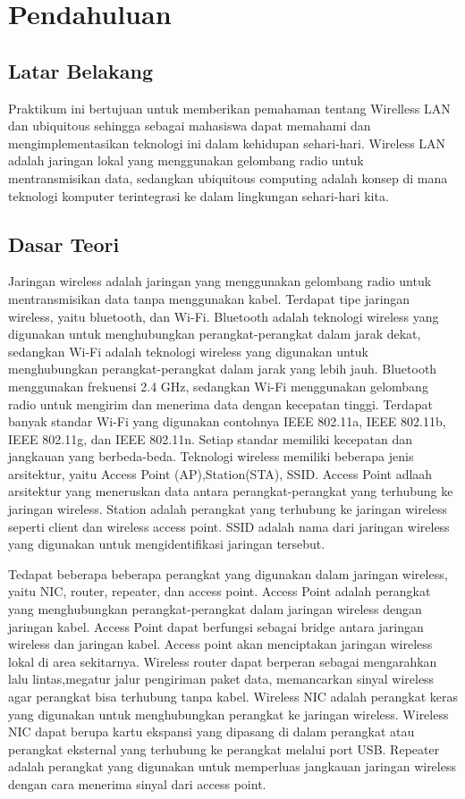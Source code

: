 \section{Pendahuluan}
\subsection{Latar Belakang}
Praktikum ini bertujuan untuk memberikan pemahaman tentang Wirelless LAN dan ubiquitous sehingga sebagai
mahasiswa dapat memahami dan mengimplementasikan teknologi ini dalam kehidupan sehari-hari. Wireless LAN adalah jaringan lokal yang menggunakan gelombang radio untuk mentransmisikan data,
sedangkan ubiquitous computing adalah konsep di mana teknologi komputer terintegrasi ke dalam lingkungan sehari-hari kita.

\subsection{Dasar Teori}
Jaringan wireless adalah jaringan yang menggunakan gelombang radio untuk mentransmisikan data tanpa menggunakan kabel.
Terdapat tipe jaringan wireless, yaitu bluetooth, dan Wi-Fi. Bluetooth adalah teknologi wireless yang digunakan untuk 
menghubungkan perangkat-perangkat dalam jarak dekat, sedangkan Wi-Fi adalah teknologi wireless yang digunakan untuk 
menghubungkan perangkat-perangkat dalam jarak yang lebih jauh. Bluetooth menggunakan frekuensi 2.4 GHz, sedangkan Wi-Fi
menggunakan gelombang radio untuk mengirim dan menerima data dengan kecepatan tinggi. Terdapat banyak standar Wi-Fi yang digunakan
contohnya IEEE 802.11a, IEEE 802.11b, IEEE 802.11g, dan IEEE 802.11n. Setiap standar memiliki kecepatan dan jangkauan yang berbeda-beda.
Teknologi wireless memiliki beberapa jenis arsitektur, yaitu Access Point (AP),Station(STA), SSID. Access Point adlaah 
arsitektur yang meneruskan data antara perangkat-perangkat yang terhubung ke jaringan wireless. 
Station adalah perangkat yang terhubung ke jaringan wireless seperti client dan wireless access point.
SSID adalah nama dari jaringan wireless yang digunakan untuk mengidentifikasi jaringan tersebut.
	
Tedapat beberapa beberapa perangkat yang digunakan dalam jaringan wireless, yaitu NIC, router, repeater, dan access point. 
Access Point adalah perangkat yang menghubungkan perangkat-perangkat dalam jaringan wireless dengan jaringan kabel.
Access Point dapat berfungsi sebagai bridge antara jaringan wireless dan jaringan kabel. Access point akan menciptakan
jaringan wireless lokal di area sekitarnya. Wireless router dapat berperan sebagai mengarahkan lalu lintas,megatur jalur 
pengiriman paket data, memancarkan sinyal wireless agar perangkat bisa terhubung tanpa kabel.
Wireless NIC adalah perangkat keras yang digunakan untuk menghubungkan perangkat ke jaringan wireless. Wireless NIC dapat berupa
kartu ekspansi yang dipasang di dalam perangkat atau perangkat eksternal yang terhubung ke perangkat melalui port USB.
Repeater adalah perangkat yang digunakan untuk memperluas jangkauan jaringan wireless dengan cara menerima sinyal dari access point.
 

